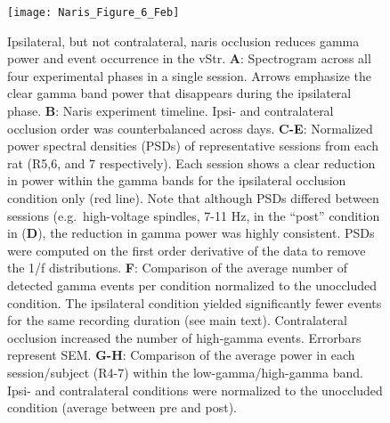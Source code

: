 \documentclass[11pt]{article}
\newcommand{\bsf}[1]{\textbf{#1}}
\begin{document}
\begin{figure}[h]
\centering
\texttt{[image: Naris\_Figure\_6\_Feb]}
\smallskip
\caption{Ipsilateral, but not contralateral, naris occlusion reduces
  gamma power and event occurrence in the vStr. \bsf{A}: Spectrogram
  across all four experimental phases in a single session. Arrows
  emphasize the clear gamma band power that disappears during the
  ipsilateral phase. \bsf{B}: Naris experiment timeline. Ipsi- and
  contralateral occlusion order was counterbalanced across
  days. \bsf{C-E}: Normalized power spectral densities (PSDs) of
  representative sessions from each rat (R5,6, and 7
  respectively). Each session shows a clear reduction in power within
  the gamma bands for the ipsilateral occlusion condition only (red
  line). Note that although PSDs differed between sessions
  (e.g.\ high-voltage spindles, 7-11 Hz, in the ``post'' condition in
  (\bsf{D}), the reduction in gamma power was highly consistent. PSDs
  were computed on the first order derivative of the data to remove
  the 1/f distributions. \bsf{F}: Comparison of the average number of
  detected gamma events per condition normalized to the unoccluded
  condition. The ipsilateral condition yielded significantly fewer
  events for the same recording duration (see main
  text). Contralateral occlusion increased the number of high-gamma
  events. Errorbars represent SEM. \bsf{G-H}: Comparison of the
  average power in each session/subject (R4-7) within the
  low-gamma/high-gamma band. Ipsi- and contralateral conditions were
  normalized to the unoccluded condition (average between pre and
  post).}
\label{fig:naris}
\end{figure}
\end{document}
